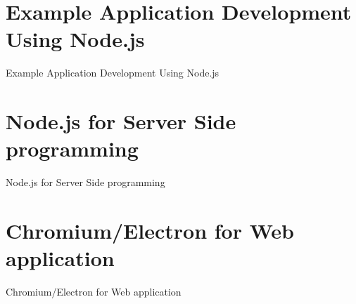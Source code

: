 \documentclass[handout, 14pt]{beamer}
\begin{document}

\def\name{Example Application Development Using Node.js}
\section{\name}
\begin{frame}[fragile]{}%
\begin{center}%
%
%
\name
\end{center}%
\end{frame}
    

\def\name{Node.js for Server Side programming}
\section{\name}
\begin{frame}[fragile]{}%
\begin{center}%
%
%
\name
\end{center}%
\end{frame}
  
 
\def\name{Chromium/Electron for Web application}
\section{\name}
\begin{frame}[fragile]{}%
\begin{center}%
%
%
\name
\end{center}%
\end{frame}
   
\end{document}
